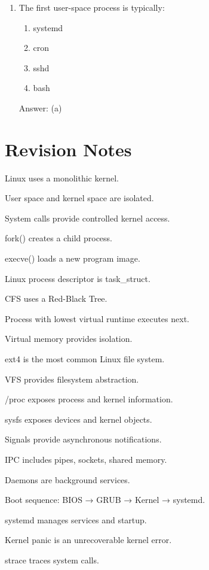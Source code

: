 \begin{enumerate}
\item The first user-space process is typically:
\begin{enumerate}[label=(\alph*)]
\item systemd
\item cron
\item sshd
\item bash
\end{enumerate}
Answer: (a)

\end{enumerate}

\section{Revision Notes}

\begin{revisionnotes}
\item Linux uses a monolithic kernel.
\item User space and kernel space are isolated.
\item System calls provide controlled kernel access.
\item fork() creates a child process.
\item execve() loads a new program image.
\item Linux process descriptor is task\_struct.
\item CFS uses a Red-Black Tree.
\item Process with lowest virtual runtime executes next.
\item Virtual memory provides isolation.
\item ext4 is the most common Linux file system.
\item VFS provides filesystem abstraction.
\item /proc exposes process and kernel information.
\item sysfs exposes devices and kernel objects.
\item Signals provide asynchronous notifications.
\item IPC includes pipes, sockets, shared memory.
\item Daemons are background services.
\item Boot sequence: BIOS → GRUB → Kernel → systemd.
\item systemd manages services and startup.
\item Kernel panic is an unrecoverable kernel error.
\item strace traces system calls.
\end{revisionnotes}

